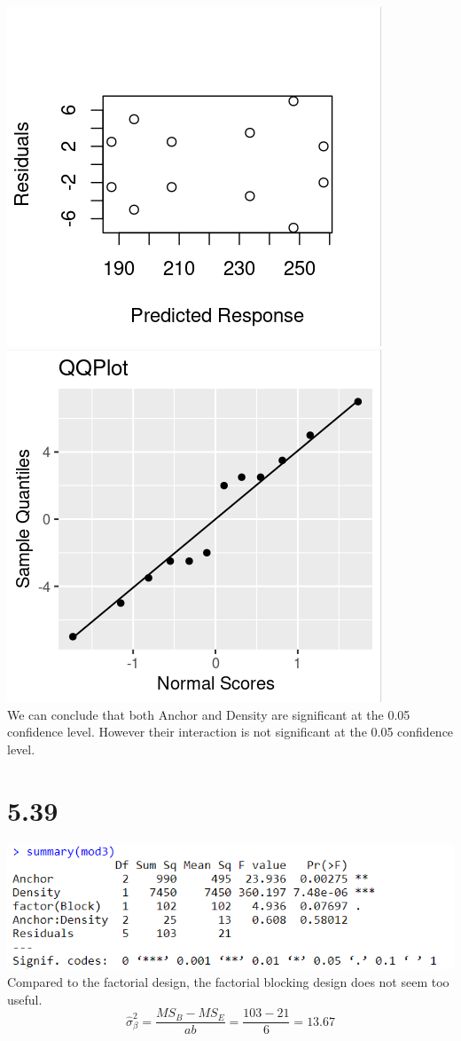 \documentclass{article}
\begin{document}
\\\includegraphics{5.29bRes.PNG} \includegraphics{5.29bQQ.PNG}
\\We can conclude that both Anchor and Density are significant at the 0.05 confidence level. However their interaction is not significant at the 0.05 confidence level.

\section*{5.39}
\includegraphics{5.39.PNG}
\\Compared to the factorial design, the factorial blocking design does not seem too useful.
$$\hat{\sigma}_\beta^2 = \frac{MS_B - MS_E}{ab} = \frac{103 - 21}{6} = 13.67$$
\end{document}
